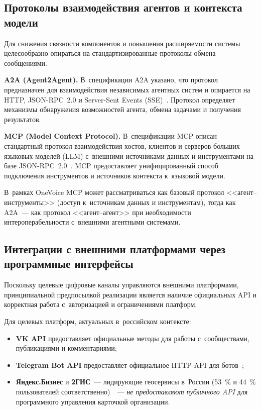 \subsection{Протоколы взаимодействия агентов и контекста модели}
\label{subsec:protocols}

Для снижения связности компонентов и повышения расширяемости системы целесообразно опираться на стандартизированные протоколы обмена сообщениями.

\textbf{A2A (Agent2Agent).} В~спецификации A2A указано, что протокол предназначен для взаимодействия независимых агентных систем и опирается на HTTP, JSON-RPC~2.0 и Server-Sent Events (SSE)~\cite{src:18, src:19}. Протокол определяет механизмы обнаружения возможностей агента, обмена задачами и получения результатов.

\textbf{MCP (Model Context Protocol).} В~спецификации MCP описан стандартный протокол взаимодействия хостов, клиентов и серверов больших языковых моделей (LLM) с~внешними источниками данных и инструментами на базе JSON-RPC~2.0~\cite{src:20, src:19}. MCP предоставляет унифицированный способ подключения инструментов и источников контекста к~языковой модели.

В~рамках OneVoice MCP может рассматриваться как базовый протокол <<агент--инструменты>> (доступ к~источникам данных и инструментам), тогда как A2A~--- как протокол <<агент--агент>> при необходимости интероперабельности с~внешними агентными системами.

\subsection{Интеграции с внешними платформами через программные интерфейсы}
\label{subsec:platform-api}

Поскольку целевые цифровые каналы управляются внешними платформами, принципиальной предпосылкой реализации является наличие официальных API и корректная работа с~авторизацией и ограничениями платформ.

Для целевых платформ, актуальных в~российском контексте:

\begin{itemize}
  \item \textbf{VK API} предоставляет официальные методы для работы с~сообществами, публикациями и комментариями;
  \item \textbf{Telegram Bot API} предоставляет официальное HTTP-API для ботов~\cite{src:21};
  \item \textbf{Яндекс.Бизнес} и \textbf{2ГИС}~--- лидирующие геосервисы в~России (53~\% и 44~\% пользователей соответственно)~\cite{src:35}~--- \textit{не предоставляют публичного API} для программного управления карточкой организации.
\end{itemize}

